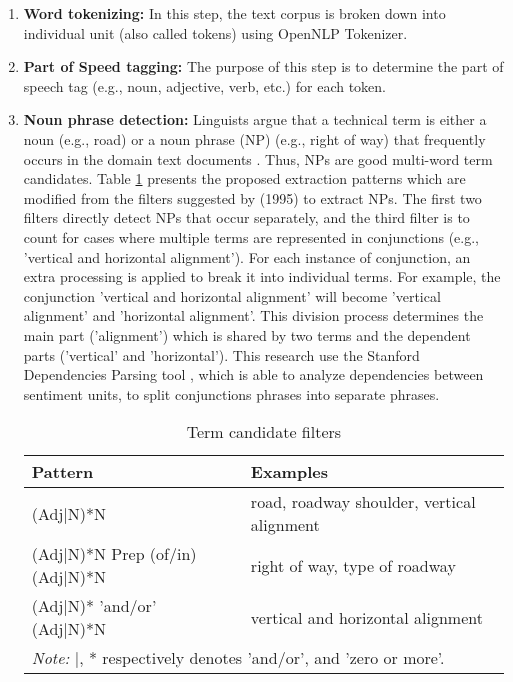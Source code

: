 \documentclass[Journal, InsideFigs, DoubleSpace]{ascelike} %
\begin{document}
\begin{enumerate}
	\item \textbf{Word tokenizing:} In this step, the text corpus is broken down into individual unit (also called tokens) using OpenNLP Tokenizer.
	\item \textbf{Part of Speed tagging:} The purpose of this step is to determine the part of speech tag (e.g., noun, adjective, verb, etc.) for each token.
	\item \textbf{Noun phrase detection:} Linguists argue that a technical term is either a noun (e.g., road) or a noun phrase (NP) (e.g., right of way) that frequently occurs in the domain text documents \cite{justeson95}. Thus, NPs are good multi-word term candidates. Table \ref{table:term_filter} presents the proposed extraction patterns which are modified from the filters suggested by (1995)\cite{justeson95} to extract NPs. The first two filters directly detect NPs that occur separately, and the third filter is to count for cases where multiple terms are represented in conjunctions (e.g., 'vertical and horizontal alignment'). For each instance of conjunction, an extra processing is applied to break it into individual terms. For example, the conjunction 'vertical and horizontal alignment' will become 'vertical alignment' and 'horizontal alignment'. This division process determines the main part ('alignment') which is shared by two terms and the dependent parts ('vertical' and 'horizontal'). This research use the Stanford Dependencies Parsing tool , which is able to analyze dependencies between sentiment units, to split conjunctions phrases into separate phrases. 
	\begin{table} [t]
		\caption{Term candidate filters}
		\label{table:term_filter}
		\centering
		\small
		\renewcommand{\arraystretch}{1.25}
		\begin{tabular}{l l}
			\hline
			\textbf{Pattern} & \textbf{Examples}\\
			\hline
			(Adj|N)*N		& road, roadway shoulder, vertical alignment\\
			(Adj|N)*N Prep (of/in) (Adj|N)*N	&	right of way, type of roadway\\
			(Adj|N)* 'and/or' (Adj|N)*N & vertical and horizontal alignment\\
			\hline
			\multicolumn{2}{l}{\textit{Note:} |, * respectively denotes 'and/or', and 'zero or more'.  } \\
			\hline
		\end{tabular}
		\normalsize
	\end{table}

\end{enumerate}
\end{document}
